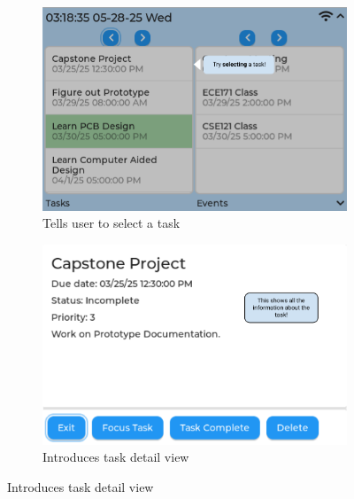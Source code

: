 \begin{figure}
\begin{subfigure}{0.5\textwidth}
    \end{subfigure}
    \begin{subfigure}{0.5\textwidth}
        \includegraphics[width = \textwidth]{task_select.png}
        \caption{Tells user to select a task}
    \end{subfigure}
    \begin{subfigure}{0.5\textwidth}
        \includegraphics[width = \textwidth]{task_detail.png}
        \caption{Introduces task detail view}
    \end{subfigure}


\end{figure}
